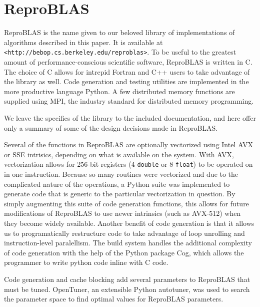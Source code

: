 \section{ReproBLAS}
  \label{sec:reproBLAS}
  ReproBLAS is the name given to our beloved library of implementations of algorithms described in this paper. 
  It is available at \texttt{<http://bebop.cs.berkeley.edu/reproblas>}. 
  To be useful to the greatest amount of performance-conscious scientific software, ReproBLAS is written in C.
  The choice of C allows for intrepid Fortran and C++ users to take advantage of the library as well.
  Code generation and testing utilities are implemented in the more productive language Python.
  A few distributed memory functions are supplied using MPI, the industry standard for distributed memory programming.

  We leave the specifics of the library to the included documentation, and here offer only a summary of some of the design decisions made in ReproBLAS.

  Several of the functions in ReproBLAS are optionally vectorized using Intel AVX or SSE intrisics, depending on what is available on the system. With AVX, vectorization allows for 256-bit registers (4 \texttt{double} or 8 \texttt{float}) to be operated on in one instruction. Because so many routines were vectorized and due to the complicated nature of the operations, a Python suite was implemented to generate code that is generic to the particular vectorization in question. By simply augmenting this suite of code generation functions, this allows for future modifications of ReproBLAS to use newer intrinsics (such as AVX-512) when they become widely available. Another benefit of code generation is that it allows us to programatically restructure code to take advantage of loop unrolling and instruction-level paralellism. The build system handles the additional complexity of code generation with the help of the Python package Cog, which allows the programmer to write python code inline with C code.

  Code generation and cache blocking add several parameters to ReproBLAS that must be tuned. OpenTuner, an extensible Python autotuner, was used to search the parameter space to find optimal values for ReproBLAS parameters.

